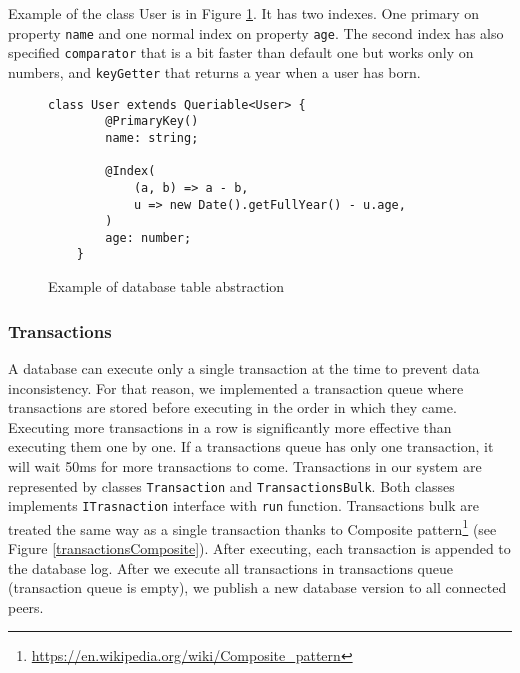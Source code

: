 Example of the class User is in Figure \ref{classExample}. It has two indexes. One primary on property \texttt{name} and one normal index on property \texttt{age}. The second index has also specified \texttt{comparator} that is a bit faster than default one but works only on numbers, and \texttt{keyGetter} that returns a year when a user has born. 

\begin{figure}[h]
    \centering
    \begin{lstlisting}[style=ES6]
    class User extends Queriable<User> {
        @PrimaryKey()
        name: string;

        @Index(
            (a, b) => a - b,
            u => new Date().getFullYear() - u.age,
        )
        age: number;
    }
    \end{lstlisting}
    \caption{Example of database table abstraction }
    \label{classExample}
\end{figure}



\subsubsection{Transactions}
A database can execute only a single transaction at the time to prevent data inconsistency. For that reason, we implemented a transaction queue where transactions are stored before executing in the order in which they came. Executing more transactions in a row is significantly more effective than executing them one by one. If a transactions queue has only one transaction, it will wait 50ms for more transactions to come. Transactions in our system are represented by classes \texttt{Transaction} and \texttt{TransactionsBulk}. Both classes implements \texttt{ITrasnaction} interface with \texttt{run} function. Transactions bulk are treated the same way as a single transaction thanks to Composite pattern\footnote{\url{https://en.wikipedia.org/wiki/Composite_pattern}} (see Figure \ref{transactionsComposite}). After executing, each transaction is appended to the database log. After we execute all transactions in transactions queue (transaction queue is empty), we publish a new database version to all connected peers.

